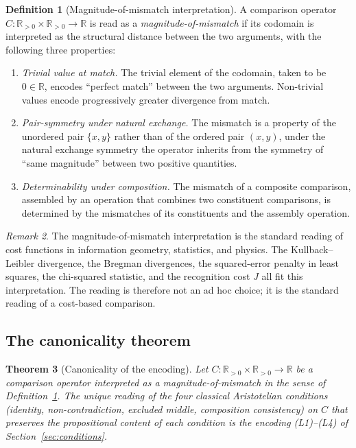 \documentclass[11pt,a4paper]{article}
\newtheorem{theorem}{Theorem}
\theoremstyle{definition}
\newtheorem{definition}[theorem]{Definition}
\theoremstyle{remark}
\newtheorem{remark}[theorem]{Remark}
\begin{document}
\begin{definition}[Magnitude-of-mismatch interpretation]
\label{def:mismatch-interpretation}
A comparison operator
$C : \mathbb{R}_{>0} \times \mathbb{R}_{>0} \to \mathbb{R}$ is read as
a \emph{magnitude-of-mismatch} if its codomain is interpreted as the
structural distance between the two arguments, with the following
three properties:
\begin{enumerate}[label=(M\arabic*),leftmargin=*]
\item \emph{Trivial value at match.} The trivial element of the
codomain, taken to be $0 \in \mathbb{R}$, encodes ``perfect match''
between the two arguments. Non-trivial values encode progressively
greater divergence from match.
\item \emph{Pair-symmetry under natural exchange.} The mismatch is a
property of the unordered pair $\{x, y\}$ rather than of the ordered
pair $(x, y)$, under the natural exchange symmetry the operator
inherits from the symmetry of ``same magnitude'' between two positive
quantities.
\item \emph{Determinability under composition.} The mismatch of a
composite comparison, assembled by an operation that combines two
constituent comparisons, is determined by the mismatches of its
constituents and the assembly operation.
\end{enumerate}
\end{definition}

\begin{remark}
The magnitude-of-mismatch interpretation is the standard reading of
cost functions in information geometry, statistics, and physics. The
Kullback--Leibler divergence, the Bregman divergences, the
squared-error penalty in least squares, the chi-squared statistic,
and the recognition cost $J$ all fit this interpretation. The reading
is therefore not an ad hoc choice; it is the standard reading of a
cost-based comparison.
\end{remark}

\subsection{The canonicality theorem}

\begin{theorem}[Canonicality of the encoding]
\label{thm:canonicality}
Let
$C : \mathbb{R}_{>0} \times \mathbb{R}_{>0} \to \mathbb{R}$ be a
comparison operator interpreted as a magnitude-of-mismatch in the
sense of Definition~\ref{def:mismatch-interpretation}. The unique
reading of the four classical Aristotelian conditions (identity,
non-contradiction, excluded middle, composition consistency) on $C$
that preserves the propositional content of each condition is the
encoding (L1)--(L4) of Section~\ref{sec:conditions}.
\end{theorem}
\end{document}
